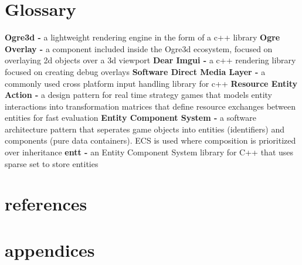 \documentclass[]{final_report}
\begin{document}
\chapter{Glossary}
\textbf{Ogre3d - }a lightweight rendering engine in the form of a c++ library \newline
\textbf{Ogre Overlay -} a component included inside the Ogre3d ecosystem, focused on overlaying 2d objects over a 3d viewport \newline
\textbf{Dear Imgui - }a c++ rendering library focused on creating debug overlays \newline
\textbf{Software Direct Media Layer -} a commonly used cross platform input handling library for c++ \newline
\textbf{Resource Entity Action - }a design pattern for real time strategy games that 
models entity interactions into transformation matrices that define resource exchanges between entities for fast evaluation \newline
\textbf{Entity Component System - }a software architecture pattern that seperates
game objects into entities (identifiers) and components (pure data containers).
ECS is used where composition is prioritized over inheritance \newline
\textbf{entt - }an Entity Component System library for C++ that uses sparse set to
store entities \newline

\chapter{references}
\cite{colson2020ecs}
\cite{abbadi2012resources}
\cite{unreal2024nanite}
\printbibliography
\newpage
\chapter{appendices}
\end{document}

